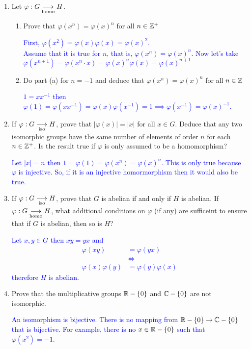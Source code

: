 \documentclass[10pt,a4paper]{report}
\newcommand{\BLUE}[1]{\textcolor{blue}{#1}}
\begin{document}
\begin{enumerate}
	\item Let $\varphi: G \underset{\text{homo}}\longrightarrow H$.
	\begin{enumerate}
		\item Prove that $\varphi(x^n)=\varphi(x)^n$ for all $n \in \mathbb{Z}^+$
		
		\BLUE{First, $\varphi(x^2) = \varphi(x)\varphi(x)=\varphi(x)^2$.  \\
		Assume that it is true for $n$, that is, $\varphi(x^n)=\varphi(x)^n$.  Now let's take $\varphi(x^{n+1})=\varphi(x^n\cdot x)=\varphi(x)^n\varphi(x)=\varphi(x)^{n+1}$
		}
		
		\item Do part (a) for $n=-1$ and deduce that $\varphi(x^n)= \varphi(x)^n$ for all $n \in \mathbb{Z}$
		
		\BLUE{
		$1=xx^{-1}$ then $\varphi(1)=\varphi(xx^{-1})=\varphi(x)\varphi(x^{-1}) = 1 \implies \varphi(x^{-1})=\varphi(x)^{-1}$.
		}
	\end{enumerate}
	
	\item If $\varphi : G\underset{\text{iso}}\longrightarrow H$, prove that $|\varphi(x)|=|x|$ for all $x\in G$.  Deduce that any two isomorphic groups have the same number of elements of order $n$ for each $n \in \mathbb{Z}^+$.  Is the result true if $\varphi$ is only assumed to be a homomorphism?
	
	\BLUE{Let $|x|=n$ then $1=\varphi(1)=\varphi(x^n)=\varphi(x)^n$.  This is only true because $\varphi$ is injective.  So, if it is an injective homormorphism then it would also be true.
	}
	
	\item If $\varphi : G \underset{\text{iso}}\longrightarrow H$, prove that $G$ is abelian if and only if $H$ is abelian.  If $\varphi: G \underset{\text{homo}}\longrightarrow H$, what additional conditions on $\varphi$ (if any) are sufficeint to ensure that if $G$ is abelian, then so is $H$?
	
	\BLUE{Let $x,y\in G$ then $xy=yx$ and 
	\begin{align*}
		\varphi(xy) &= \varphi(yx) \\
		&\iff\\
		\varphi(x)\varphi(y) &= \varphi(y)\varphi(x)
	\end{align*}therefore $H$ is abelian.
	}

	\item Prove that the multiplicative groups $\mathbb{R}-\{0\}$ and $\mathbb{C}-\{0\}$ are not isomorphic.
	
	\BLUE{An isomorphism is bijective. There is no mapping from $\mathbb{R}-\{0\} \to \mathbb{C}-\{0\}$ that is bijective.  For example, there is no $x\in\mathbb{R}-\{0\}$ such that $\varphi(x^2) = -1$.
	}
	

\end{enumerate}
\end{document}
